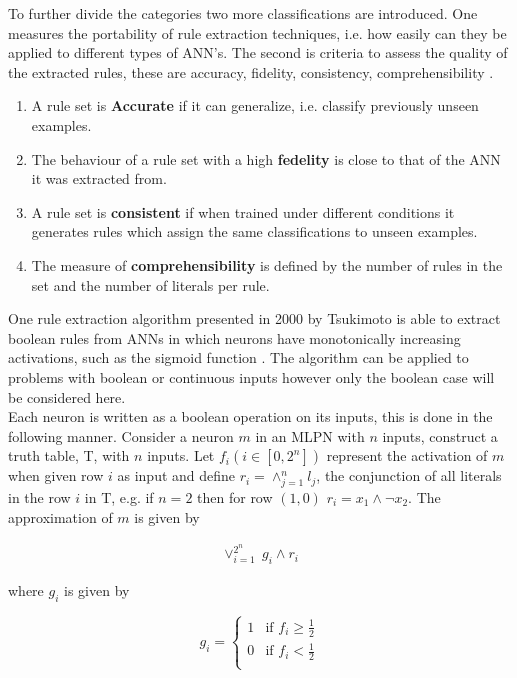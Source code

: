To further divide the categories two more classifications are introduced. One measures the portability of rule extraction techniques, i.e. how easily can they be applied to different types of ANN's. The second is criteria to assess the quality of the extracted rules, these are accuracy, fidelity, consistency, comprehensibility \cite{andrews1995survey}.

\begin{enumerate}
\item A rule set is \textbf{Accurate} if it can generalize, i.e. classify previously unseen examples.
\item The behaviour of a rule set with a high \textbf{fedelity} is close to that of the ANN it was extracted from.
\item A rule set is \textbf{consistent} if when trained under different conditions it generates rules which assign the same classifications to unseen examples.
\item The measure of \textbf{comprehensibility} is defined by the number of rules in the set and the number of literals per rule.
\end{enumerate}

One rule extraction algorithm presented in 2000 by Tsukimoto is able to extract boolean rules from ANNs in which neurons have monotonically increasing activations, such as the sigmoid function \cite{tsukimoto2000extracting}. The algorithm can be applied to problems with boolean or continuous inputs however only the boolean case will be considered here.\\

Each neuron is written as a boolean operation on its inputs, this is done in the following manner. Consider a neuron $m$ in an MLPN with $n$ inputs, construct a truth table, T, with $n$ inputs. Let $f_i (i \in [0, 2^n])$ represent the activation of $m$ when given row $i$ as input and define $r_i = \land_{j=1}^{n} l_j$, the conjunction of all literals in the row $i$ in T, e.g. if $n=2$ then for row $(1,0)$ $r_i = x_1 \land \lnot x_2$. The approximation of $m$ is given by 

\begin{align}
	\lor_{i=1}^{2^n}\ g_i \land r_i
\end{align}

where $g_i$ is given by

\[
g_i =
\begin{cases}
1 & \text{if $f_i \geq \frac{1}{2}$} \\
0 & \text{if $f_i < \frac{1}{2}$} \\
\end{cases}
\]

